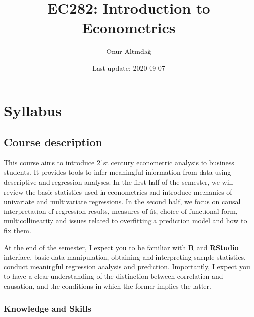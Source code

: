 \documentclass[
]{book}
\title{EC282: Introduction to Econometrics}
\author{Onur Altındağ}
\date{Last update: 2020-09-07}
\begin{document}
\maketitle

{
\setcounter{tocdepth}{1}
\tableofcontents
}
\hypertarget{syllabus}{%
\chapter*{Syllabus}\label{syllabus}}

\hypertarget{course-desctiption}{%
\section*{Course description}\label{course-desctiption}}

This course aims to introduce 21st century econometric analysis to business students. It provides tools to infer meaningful information from data using descriptive and regression analyses. In the first half of the semester, we will review the basic statistics used in econometrics and introduce mechanics of univariate and multivariate regressions. In the second half, we focus on causal interpretation of regression results, measures of fit, choice of functional form, multicollinearity and issues related to overfitting a prediction model and how to fix them.

At the end of the semester, I expect you to be familiar with \textbf{R} and \textbf{RStudio} interface, basic data manipulation, obtaining and interpreting sample statistics, conduct meaningful regression analysis and prediction. Importantly, I expect you to have a clear understanding of the distinction between correlation and causation, and the conditions in which the former implies the latter.

\hypertarget{knowledge}{%
\subsection*{Knowledge and Skills}\label{knowledge}}
\end{document}
